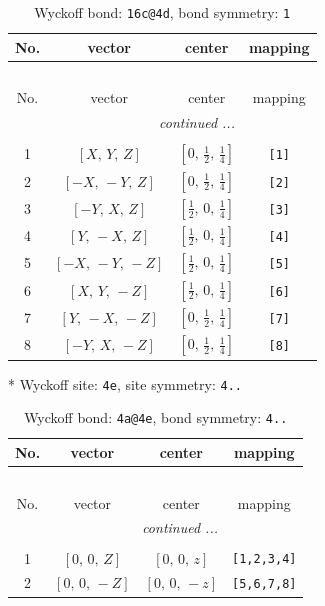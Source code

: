 \documentclass[fleqn,8pt]{jsarticle}
\begin{document}
\begin{longtable}{cccc}
\caption{Wyckoff bond: {\tt 16c@4d}, bond symmetry: {\tt 1}}
 \\
 \hline \hline
No. & vector & center & mapping \\ \hline \endfirsthead

\multicolumn{3}{l}{\tablename\ \thetable{}} \\
 \hline \hline
No. & vector & center & mapping \\ \hline \endhead

 \hline \hline
\multicolumn{3}{r}{\footnotesize\it continued ...} \\ \endfoot

 \hline \hline
\multicolumn{3}{r}{} \\ \endlastfoot

1 & $\left[ X,\, Y,\, Z \right]$ & $\left[ 0,\, \frac{1}{2},\, \frac{1}{4} \right]$ & {\tt [1]} \\ \hline
2 & $\left[ - X,\, - Y,\, Z \right]$ & $\left[ 0,\, \frac{1}{2},\, \frac{1}{4} \right]$ & {\tt [2]} \\ \hline
3 & $\left[ - Y,\, X,\, Z \right]$ & $\left[ \frac{1}{2},\, 0,\, \frac{1}{4} \right]$ & {\tt [3]} \\ \hline
4 & $\left[ Y,\, - X,\, Z \right]$ & $\left[ \frac{1}{2},\, 0,\, \frac{1}{4} \right]$ & {\tt [4]} \\ \hline
5 & $\left[ - X,\, - Y,\, - Z \right]$ & $\left[ \frac{1}{2},\, 0,\, \frac{1}{4} \right]$ & {\tt [5]} \\ \hline
6 & $\left[ X,\, Y,\, - Z \right]$ & $\left[ \frac{1}{2},\, 0,\, \frac{1}{4} \right]$ & {\tt [6]} \\ \hline
7 & $\left[ Y,\, - X,\, - Z \right]$ & $\left[ 0,\, \frac{1}{2},\, \frac{1}{4} \right]$ & {\tt [7]} \\ \hline
8 & $\left[ - Y,\, X,\, - Z \right]$ & $\left[ 0,\, \frac{1}{2},\, \frac{1}{4} \right]$ & {\tt [8]} \\
\end{longtable}
* Wyckoff site: {\tt 4e}, site symmetry: {\tt 4..}
\renewcommand{\arraystretch}{1.2}
\begin{longtable}{cccc}
\caption{Wyckoff bond: {\tt 4a@4e}, bond symmetry: {\tt 4..}}
 \\
 \hline \hline
No. & vector & center & mapping \\ \hline \endfirsthead

\multicolumn{3}{l}{\tablename\ \thetable{}} \\
 \hline \hline
No. & vector & center & mapping \\ \hline \endhead

 \hline \hline
\multicolumn{3}{r}{\footnotesize\it continued ...} \\ \endfoot

 \hline \hline
\multicolumn{3}{r}{} \\ \endlastfoot

1 & $\left[ 0,\, 0,\, Z \right]$ & $\left[ 0,\, 0,\, z \right]$ & {\tt [1,2,3,4]} \\ \hline
2 & $\left[ 0,\, 0,\, - Z \right]$ & $\left[ 0,\, 0,\, - z \right]$ & {\tt [5,6,7,8]} \\
\end{longtable}
\end{document}
